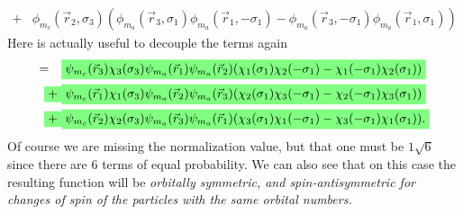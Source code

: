 \begin{questions}
\begin{solution}
\begin{equation*}
\begin{aligned}
    + & \phi_{m_c}(\vec{r}_2,\sigma_3)( \phi_{m_a}(\vec{r}_3,\sigma_1)\phi_{m_a}(\vec{r}_1,-\sigma_1) - \phi_{m_a}(\vec{r}_3,-\sigma_1)\phi_{m_a}(\vec{r}_1,\sigma_1) )
  \end{aligned}
\end{equation*}
Here is actually useful to decouple the terms again
\begin{equation}
  \begin{aligned}
    =\quad &\hlgreen{\psi_{m_c}(\vec{r}_3)\chi_3(\sigma_3)\psi_{m_a}(\vec{r}_1)\psi_{m_a}(\vec{r}_2)(\chi_1(\sigma_1)\chi_2(-\sigma_1) - \chi_1(-\sigma_1)\chi_2(\sigma_1))} \\  \hlgreen{+}
    & \hlgreen{\psi_{m_c}(\vec{r}_1)\chi_1(\sigma_3)\psi_{m_a}(\vec{r}_2)\psi_{m_a}(\vec{r}_3)(\chi_2(\sigma_1)\chi_3(-\sigma_1) - \chi_2(-\sigma_1)\chi_3(\sigma_1))}\\
    \hlgreen{+} & \hlgreen{\psi_{m_c}(\vec{r}_2)\chi_2(\sigma_3)\psi_{m_a}(\vec{r}_3)\psi_{m_a}(\vec{r}_1)( \chi_3(\sigma_1)\chi_1(-\sigma_1) - \chi_3(-\sigma_1)\chi_1(\sigma_1) ).}
  \end{aligned}
\end{equation}
Of course we are missing the normalization value, but that one must be $1\sqrt{6}$ since there are 6 terms of equal probability. We can also see that on this case the resulting function will be \textit{orbitally symmetric, and spin-antisymmetric for changes of spin of the particles with the same orbital numbers.}
\end{solution}
\end{questions}
